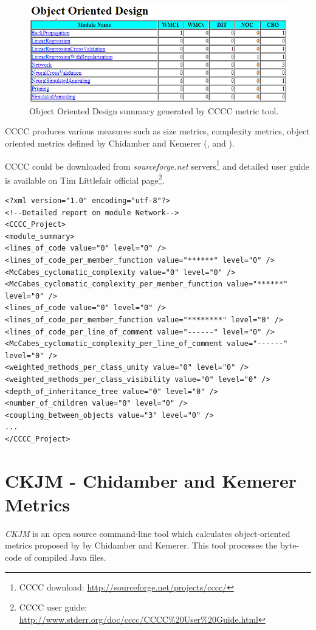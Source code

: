 \begin{figure}[h!]
	\centering
	\includegraphics[scale=0.6]{img/cccc2.png} 
	\caption{Object Oriented Design summary generated by CCCC metric tool.}		
	\label{fig:cccc2}
\end{figure}

CCCC produces various measures such as size metrics, complexity metrics, object oriented metrics defined by Chidamber and Kemerer (\cite{indie}, \cite{vaxjo} and \cite{cccc1}).

CCCC could be downloaded from \textit{sourceforge.net} servers\footnote{CCCC download: \url{http://sourceforge.net/projects/cccc/}} and detailed user guide is available on Tim Littlefair official page\footnote{CCCC user guide: \url{http://www.stderr.org/doc/cccc/CCCC\%20User\%20Guide.html}}.

\begin{lstlisting}[caption=XML representation of results generated by CCCC metric tool, label=ccccXml]
<?xml version="1.0" encoding="utf-8"?>
<!--Detailed report on module Network-->
<CCCC_Project>
<module_summary>
<lines_of_code value="0" level="0" />
<lines_of_code_per_member_function value="******" level="0" />
<McCabes_cyclomatic_complexity value="0" level="0" />
<McCabes_cyclomatic_complexity_per_member_function value="******" level="0" />
<lines_of_code value="0" level="0" />
<lines_of_code_per_member_function value="********" level="0" />
<lines_of_code_per_line_of_comment value="------" level="0" />
<McCabes_cyclomatic_complexity_per_line_of_comment value="------" level="0" />
<weighted_methods_per_class_unity value="0" level="0" />
<weighted_methods_per_class_visibility value="0" level="0" />
<depth_of_inheritance_tree value="0" level="0" />
<number_of_children value="0" level="0" />
<coupling_between_objects value="3" level="0" />
...
</CCCC_Project>
\end{lstlisting}

\section{CKJM - Chidamber and Kemerer Metrics}
\textit{CKJM} is an open source command-line tool which calculates object-oriented metrics proposed by by Chidamber and Kemerer. This tool processes the byte-code of compiled Java files. 

